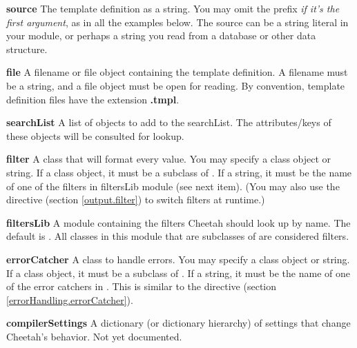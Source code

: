 \begin{description}
\item{{\bf source}}
     The template definition as a string.  You may omit the 
     prefix {\em if it's the first argument}, as in all the examples below.
     The source can be a string literal in your module, or perhaps a string
     you read from a database or other data structure.
\item{{\bf file}}
     A filename or file object containing the template definition.
     A filename must be a string, and a file object must be open for reading.
     By convention, template definition files have the extension
     {\bf .tmpl}.
\item{{\bf searchList}}
     A list of objects to add to the searchList.  The attributes/keys of these
     objects will be consulted for  lookup.
\item{{\bf filter}}
     A class that will format every  value.  You may
     specify a class object or string.  If a class object,
     it must be a subclass of .  If a string, it
     must be the name of one of the filters in filtersLib module (see next 
     item).
     (You may also use the  directive (section
     \ref{output.filter}) to switch filters at runtime.)
\item{{\bf filtersLib}}
     A module containing the filters Cheetah should look up by name.  The
     default is .  All classes in this module that are
     subclasses of  are considered filters.
\item{{\bf errorCatcher}}
     A class to handle  errors.  You may
     specify a class object or string.  If a class object,
     it must be a subclass of .  
     If a string, it must be the name of one of the error catchers in
     .  This is similar to the 
      directive 
     (section \ref{errorHandling.errorCatcher}).
\item{{\bf compilerSettings}}
     A dictionary (or dictionary hierarchy) of settings that change Cheetah's
     behavior.  Not yet documented.
\end{description}

